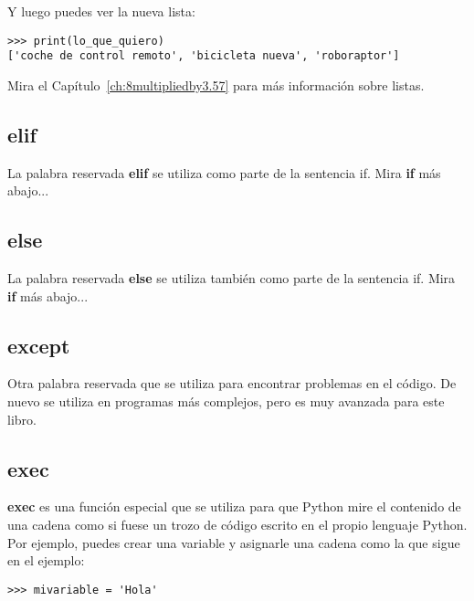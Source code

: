 \noindent
Y luego puedes ver la nueva lista:

\begin{listing}
\begin{verbatim}
>>> print(lo_que_quiero)
['coche de control remoto', 'bicicleta nueva', 'roboraptor']
\end{verbatim}
\end{listing}

\noindent
Mira el Capítulo~\ref{ch:8multipliedby3.57} para más información sobre listas.

\subsection*{elif}

La palabra reservada \textbf{elif} se utiliza como parte de la sentencia if.  Mira \textbf{if} más abajo...

\subsection*{else}

La palabra reservada \textbf{else} se utiliza también como parte de la sentencia if.  Mira \textbf{if} más abajo...

\subsection*{except}

Otra palabra reservada que se utiliza para encontrar problemas en el código.  De nuevo se utiliza en programas más complejos, pero es muy avanzada para este libro.

\subsection*{exec}

\textbf{exec} es una función especial que se utiliza para que Python mire el contenido de una cadena como si fuese un trozo de código escrito en el propio lenguaje Python.  Por ejemplo, puedes crear una variable y asignarle una cadena como la que sigue en el ejemplo:

\begin{listing}
\begin{verbatim}
>>> mivariable = 'Hola'
\end{verbatim}
\end{listing}

